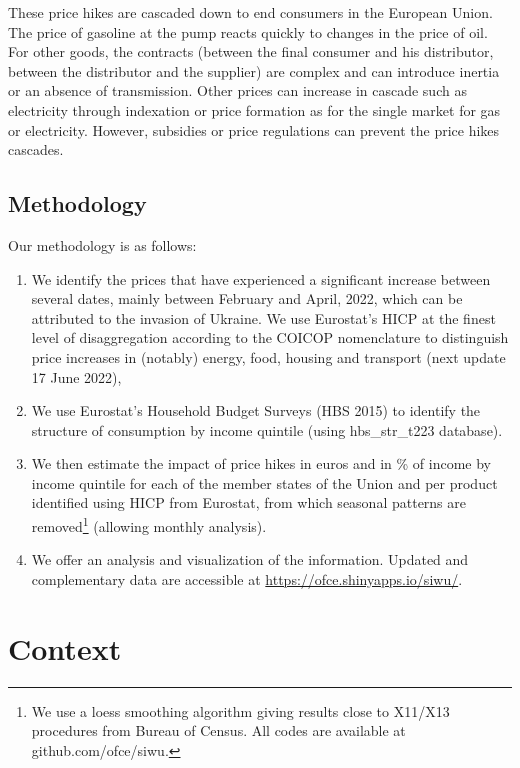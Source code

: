 \documentclass[
  9pt,
  a4paper,
  DIV=11,
  numbers=noendperiod]{scrartcl}
\providecommand{\tightlist}{%
  \setlength{\itemsep}{0pt}\setlength{\parskip}{0pt}}\usepackage{longtable,booktabs,array}
\begin{document}
These price hikes are cascaded down to end consumers in the European
Union. The price of gasoline at the pump reacts quickly to changes in
the price of oil. For other goods, the contracts (between the final
consumer and his distributor, between the distributor and the supplier)
are complex and can introduce inertia or an absence of transmission.
Other prices can increase in cascade such as electricity through
indexation or price formation as for the single market for gas or
electricity. However, subsidies or price regulations can prevent the
price hikes cascades.

\hypertarget{methodology}{%
\subsection{Methodology}\label{methodology}}

Our methodology is as follows:

\begin{enumerate}
\def\labelenumi{\arabic{enumi}.}
\tightlist
\item
  We identify the prices that have experienced a significant increase
  between several dates, mainly between February and April, 2022, which
  can be attributed to the invasion of Ukraine. We use Eurostat's HICP
  at the finest level of disaggregation according to the COICOP
  nomenclature to distinguish price increases in (notably) energy, food,
  housing and transport (next update 17 June 2022),
\item
  We use Eurostat's Household Budget Surveys (HBS 2015) to identify the
  structure of consumption by income quintile (using hbs\_str\_t223
  database).
\item
  We then estimate the impact of price hikes in euros and in \% of
  income by income quintile for each of the member states of the Union
  and per product identified using HICP from Eurostat, from which
  seasonal patterns are removed\footnote{We use a loess smoothing
    algorithm giving results close to X11/X13 procedures from Bureau of
    Census. All codes are available at github.com/ofce/siwu.} (allowing
  monthly analysis).
\item
  We offer an analysis and visualization of the information. Updated and
  complementary data are accessible at
  \url{https://ofce.shinyapps.io/siwu/}.
\end{enumerate}

\hypertarget{context}{%
\section{Context}\label{context}}
\end{document}
